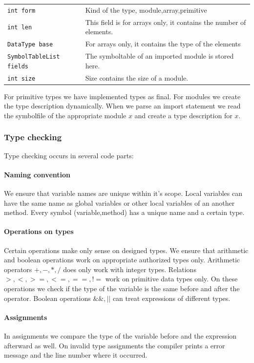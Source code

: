 \begin{tabular}{lp{6cm}}
\texttt{int form} & Kind of the type, module,array,primitive \\
\texttt{int len} & This field is for arrays only, it contains the number of elements. \\
\texttt{DataType base} & For arrays only, it contains the type of the elements \\
\texttt{SymbolTableList fields} & The symboltable of an imported module is stored here. \\
\texttt{int size} & Size contains the size of a module. \\
\end{tabular}

For primitive types we have implemented types as final. For modules we create the type description dynamically. When we parse an import
statement we read the symbolfile of the appropriate module $x$ and create a type description for $x$.

\subsubsection{Type checking}
Type checking occurs in several code parts:

\paragraph{Naming convention}
We ensure that variable names are unique within it's scope. Local variables can have the same name as global variables or other local variables
of an another method. Every symbol (variable,method) has a unique name and a certain type. 

\paragraph{Operations on types}
Certain operations make only sense on designed types. We ensure that arithmetic and boolean operations work on appropriate authorized
types only. Arithmetic operators ${+,-,*,/}$ does only work with integer types. 
Relations ${>,<,>=,<=,==,!=}$ work on primitive data types only. On these operations we check if the type of the variable
 is the same before and after the operator.
Boolean operations ${\&\&,||}$ can treat expressions of different types. 

\paragraph{Assignments}
In assignments we compare the type of the variable before and the expression afterward as well. On invalid type assignments the compiler
prints a error message and the line number where it occurred.



